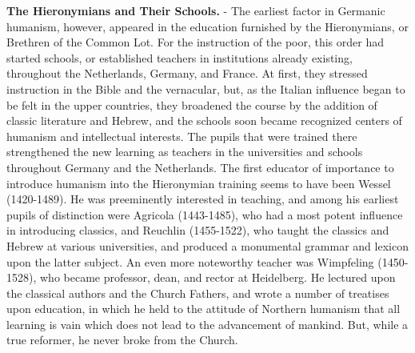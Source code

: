 \documentclass[
]{book}
\begin{document}
\textbf{The Hieronymians and Their Schools.} - The earliest factor in Germanic humanism, however, appeared in the education furnished by the Hieronymians, or Brethren of the Common Lot. For the instruction of the poor, this order had started schools, or established teachers in institutions already existing, throughout the Netherlands, Germany, and France. At first, they stressed instruction in the Bible and the vernacular, but, as the Italian influence began to be felt in the upper countries, they broadened the course by the addition of classic literature and Hebrew, and the schools soon became recognized centers of humanism and intellectual interests. The pupils that were trained there strengthened the new learning as teachers in the universities and schools throughout Germany and the Netherlands. The first educator of importance to introduce humanism into the Hieronymian training seems to have been Wessel (1420-1489). He was preeminently interested in teaching, and among his earliest pupils of distinction were Agricola (1443-1485), who had a most potent influence in introducing classics, and Reuchlin (1455-1522), who taught the classics and Hebrew at various universities, and produced a monumental grammar and lexicon upon the latter subject. An even more noteworthy teacher was Wimpfeling (1450-1528), who became professor, dean, and rector at Heidelberg. He lectured upon the classical authors and the Church Fathers, and wrote a number of treatises upon education, in which he held to the attitude of Northern humanism that all learning is vain which does not lead to the advancement of mankind. But, while a true reformer, he never broke from the Church.
\end{document}
